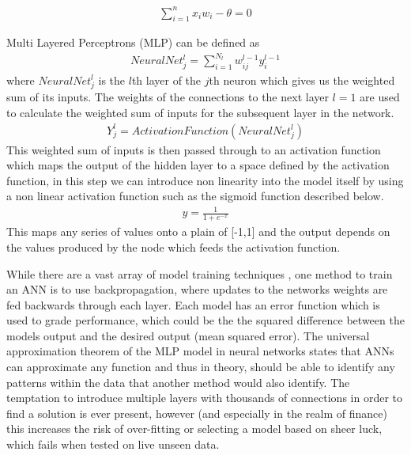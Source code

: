 \documentclass[11pt, a4paper]{article}
\begin{document}
\begin{align}
\sum^{n}_{i = 1} x_{i}w_{i} - \theta = 0  
\end{align}

Multi Layered Perceptrons (MLP) can be defined as 
\begin{align}
NeuralNet^{l}_{j} =  \sum^{N_{l}}_{i = 1}w^{l-1}_{ij} y^{l-1}_{i}  
\end{align}
where $NeuralNet^{l}_{j}$ is the $l$th layer of the $j$th neuron which gives us the weighted sum of its inputs. The weights of the connections to the next layer $l=1$ are used to calculate the weighted sum of inputs for the subsequent layer in the network.  \begin{align}
Y^{l}_{j} =  ActivationFunction(NeuralNet^{l}_{j})  
\end{align} 
This weighted sum of inputs is then passed through to an activation function which maps the output of the hidden layer to a space defined by the activation function, in this step we can introduce non linearity into the model itself by using a non linear activation function such as the sigmoid function described below.
\begin{align}
y =  \frac{1}{1+e^{-x} }
\end{align} 
This maps any series of values onto a plain of [-1,1] and the output depends on the values produced by the node which feeds the activation function. \par While there are a vast array of model training techniques , one method to train an ANN is to use backpropagation, where updates to the networks weights are fed backwards through each layer. Each model has an error function which is used to grade performance, which could be the the squared difference between the models output and the desired output (mean squared error).  \newline The universal approximation theorem \cite{Kurkova1992} of the MLP model in neural networks states that ANNs can approximate any function and thus in theory, should be able to identify any patterns within the data that another method would also identify. \newline The temptation to introduce multiple layers with thousands of connections in order to find a solution is ever present, however (and especially in the realm of finance) this increases the risk of over-fitting or selecting a model based on sheer luck, which fails when tested on live unseen data. 
\end{document}
